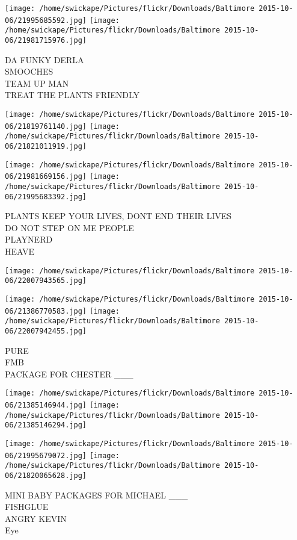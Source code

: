 \documentclass[10pt,letterpaper]{article}
\begin{document}
\texttt{[image: /home/swickape/Pictures/flickr/Downloads/Baltimore 2015-10-06/21995685592.jpg]}
\texttt{[image: /home/swickape/Pictures/flickr/Downloads/Baltimore 2015-10-06/21981715976.jpg]}

DA FUNKY DERLA\\
SMOOCHES\\
TEAM UP MAN\\
TREAT THE PLANTS FRIENDLY\\
\pagebreak

\texttt{[image: /home/swickape/Pictures/flickr/Downloads/Baltimore 2015-10-06/21819761140.jpg]}
\texttt{[image: /home/swickape/Pictures/flickr/Downloads/Baltimore 2015-10-06/21821011919.jpg]}

\texttt{[image: /home/swickape/Pictures/flickr/Downloads/Baltimore 2015-10-06/21981669156.jpg]}
\texttt{[image: /home/swickape/Pictures/flickr/Downloads/Baltimore 2015-10-06/21995683392.jpg]}

PLANTS KEEP YOUR LIVES, DONT END THEIR LIVES\\
DO NOT STEP ON ME PEOPLE\\
PLAYNERD\\
HEAVE\\
\pagebreak

\texttt{[image: /home/swickape/Pictures/flickr/Downloads/Baltimore 2015-10-06/22007943565.jpg]}

\vspace{0.25in}
\texttt{[image: /home/swickape/Pictures/flickr/Downloads/Baltimore 2015-10-06/21386770583.jpg]}
\texttt{[image: /home/swickape/Pictures/flickr/Downloads/Baltimore 2015-10-06/22007942455.jpg]}

PURE\\
FMB\\
PACKAGE FOR CHESTER \_\_\_\\
\pagebreak

\texttt{[image: /home/swickape/Pictures/flickr/Downloads/Baltimore 2015-10-06/21385146944.jpg]}
\texttt{[image: /home/swickape/Pictures/flickr/Downloads/Baltimore 2015-10-06/21385146294.jpg]}

\texttt{[image: /home/swickape/Pictures/flickr/Downloads/Baltimore 2015-10-06/21995679072.jpg]}
\texttt{[image: /home/swickape/Pictures/flickr/Downloads/Baltimore 2015-10-06/21820065628.jpg]}

MINI BABY PACKAGES FOR MICHAEL \_\_\_\\
FISHGLUE\\
ANGRY KEVIN\\
Eye\\
\pagebreak
\end{document}
